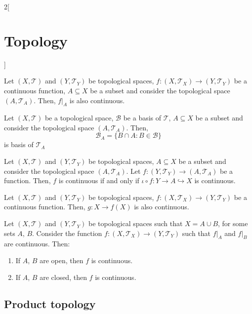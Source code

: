 \documentclass[../../../main.tex]{subfiles}
\begin{document}
\begin{multicols}{2}[\section{Topology}]
\begin{prop}
  \end{prop}
  \begin{prop}
    Let $(X,\mathcal{T})$ and $(Y,\mathcal{T}_Y)$ be topological spaces, $f:(X,\mathcal{T}_X)\rightarrow (Y,\mathcal{T}_Y)$ be a continuous function, $A\subseteq X$ be a subset and consider the topological space $(A,\mathcal{T}_A)$. Then, $f|_A$ is also continuous.
  \end{prop}
  \begin{prop}
    Let $(X,\mathcal{T})$ be a topological space, $\mathcal{B}$ be a basis of $\mathcal{T}$, $A\subseteq X$ be a subset and consider the topological space $(A,\mathcal{T}_A)$. Then, $$\mathcal{B}_A=\{B\cap A:B\in\mathcal{B}\}$$ is basis of $\mathcal{T}_A$
  \end{prop}
  \begin{prop}
    Let $(X,\mathcal{T})$ and $(Y,\mathcal{T}_Y)$ be topological spaces, $A\subseteq X$ be a subset and consider the topological space $(A,\mathcal{T}_A)$. Let $f:(Y,\mathcal{T}_Y)\rightarrow (A,\mathcal{T}_A)$ be a function. Then, $f$ is continuous if and only if $\iota\circ f:Y\rightarrow A\hookrightarrow X$ is continuous.
  \end{prop}
  \begin{corollary}
    Let $(X,\mathcal{T})$ and $(Y,\mathcal{T}_Y)$ be topological spaces, $f:(X,\mathcal{T}_X)\rightarrow (Y,\mathcal{T}_Y)$ be a continuous function. Then, $g:X\rightarrow f(X)$ is also continuous.
  \end{corollary}
  \begin{prop}
    Let $(X,\mathcal{T})$ and $(Y,\mathcal{T}_Y)$ be topological spaces such that $X=A\cup B$, for some sets $A$, $B$. Consider the function $f:(X,\mathcal{T}_X)\rightarrow (Y,\mathcal{T}_Y)$ such that $f|_A$ and $f|_B$ are continuous. Then:
    \begin{enumerate}
      \item If $A$, $B$ are open, then $f$ is continuous.
      \item If $A$, $B$ are closed, then $f$ is continuous.
    \end{enumerate}
  \end{prop}
  \subsection{Product topology}

\end{multicols}
\end{document}
